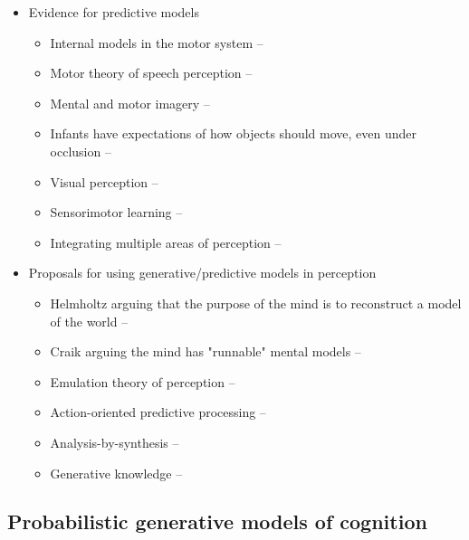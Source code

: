 \documentclass[12pt]{article}
\begin{document}
\begin{itemize}
\item Evidence for predictive models
    \begin{itemize}
    \item Internal models in the motor system -- \citep{Kawato1999,Flanagan2003}
    \item Motor theory of speech perception -- \citep{Bever2010}
    \item Mental and motor imagery -- \citep{Parsons1994,Kosslyn1988,Hegarty2004}
    \item Infants have expectations of how objects should move, even under occlusion -- \citep{Teglas2011}
    \item Visual perception -- \citep{Weiss2002}
    \item Sensorimotor learning -- \citep{Kording2004}
    \item Integrating multiple areas of perception -- \citep{Ernst2002}
    \end{itemize}

\item Proposals for using generative/predictive models in perception
    \begin{itemize}
    \item Helmholtz arguing that the purpose of the mind is to reconstruct a model of the world -- \citep{Helmholtz1925}
    \item Craik arguing the mind has "runnable" mental models -- \citep{Craik1943}
    \item Emulation theory of perception -- \citep{Grush2004}
    \item Action-oriented predictive processing -- \citep{Clark2013}
    \item Analysis-by-synthesis -- \citep{Halle1959,Halle1962,Bever2010,Yuille2006}
    \item Generative knowledge -- \citep{Battaglia2012}
    \end{itemize}

\end{itemize}

\subsection*{Probabilistic generative models of cognition}
\end{document}
